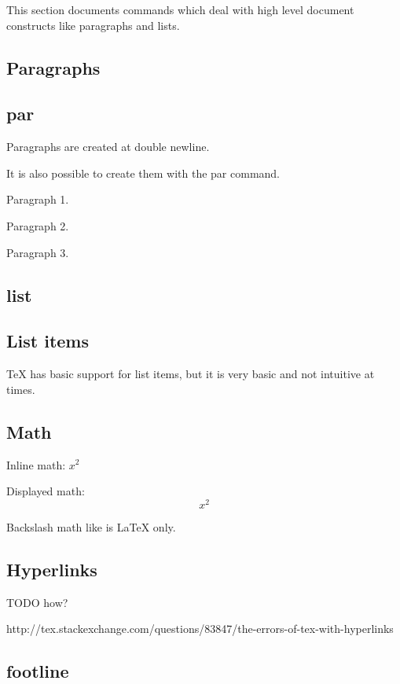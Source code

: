   This section documents commands which deal with high level document constructs like paragraphs and lists.

  \subsection{Paragraphs}

  \subsection{par}

    Paragraphs are created at double newline.

    It is also possible to create them with the \bs par command.

    Paragraph 1. \par
    Paragraph 2. \par
    Paragraph 3. \par

  \subsection{list}

  \subsection{List items}

    TeX has basic support for list items, but it is very basic and not intuitive at times.

  \subsection{Math}

    Inline math: $x^2$

    Displayed math: $$x^2$$

    Backslash math like \bs [ \bs ] is LaTeX only.

  \subsection{Hyperlinks}

    TODO how?

    http://tex.stackexchange.com/questions/83847/the-errors-of-tex-with-hyperlinks

  \subsection{footline}


